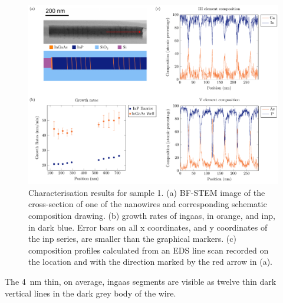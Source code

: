 \begin{figure}
    \centering
    \includegraphics[width=\textwidth]{4_Properties/From_Article2/Figure4.pdf}
    \caption{Characterisation results for sample 1. (a) BF-STEM image of the cross-section of one of the nanowires and corresponding schematic composition drawing. (b) growth rates of \acs{ingaas}, in orange, and \acs{inp}, in dark blue. Error bars on all x coordinates, and y coordinates of the \acs{inp} series, are smaller than the graphical markers. (c) composition profiles calculated from an EDS line scan recorded on the location and with the direction marked by the red arrow in (a).}
    \label{fig:growth_rates}
\end{figure}


The \qty{4}{\nm} thin, on average, \acs{ingaas} segments are visible as twelve thin dark vertical lines in the dark grey body of the wire. 


